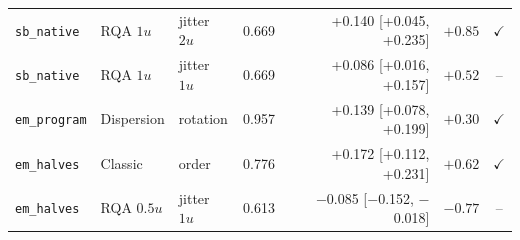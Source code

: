 \begin{tabular}{lllrrrc}
\texttt{sb\_native} & RQA $1u$ & jitter $2u$ & 0.669 & +0.140 [+0.045, +0.235] & $+0.85$ & $\checkmark$ \\
\texttt{sb\_native} & RQA $1u$ & jitter $1u$ & 0.669 & +0.086 [+0.016, +0.157] & $+0.52$ & -- \\
\texttt{em\_program} & Dispersion & rotation & 0.957 & +0.139 [+0.078, +0.199] & $+0.30$ & $\checkmark$ \\
\texttt{em\_halves} & Classic & order & 0.776 & +0.172 [+0.112, +0.231] & $+0.62$ & $\checkmark$ \\
\texttt{em\_halves} & RQA $0.5u$ & jitter $1u$ & 0.613 & $-$0.085 [$-$0.152, $-$0.018] & $-0.77$ & -- \\
\bottomrule
\end{tabular}
